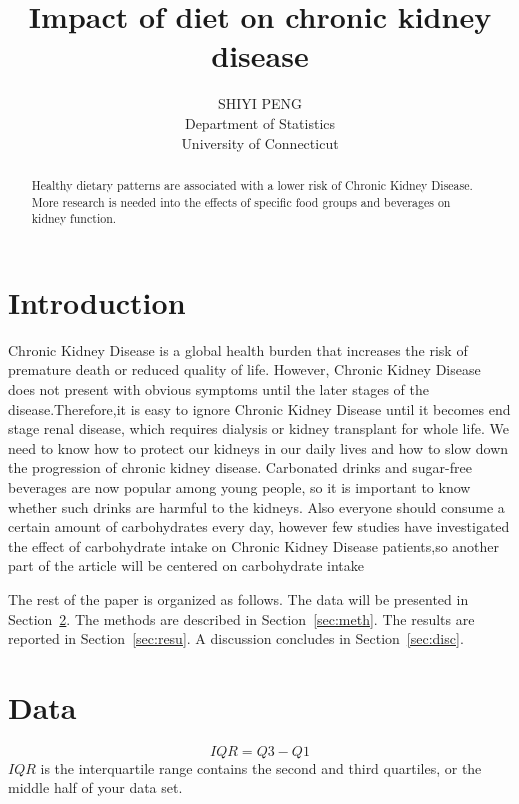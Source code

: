 \documentclass[12pt]{article}
\title{Impact of diet on chronic kidney disease}
\author{SHIYI PENG\\
  Department of Statistics\\
  University of Connecticut
}
\begin{document}
\maketitle

\begin{abstract}

Healthy dietary patterns are associated with a lower risk of Chronic Kidney Disease. More research is needed into the effects of specific food groups and beverages on kidney function\cite{van2020diet}.

\end{abstract}


\section{Introduction}
\label{sec:intro}

Chronic Kidney Disease is a global health burden that increases the risk of premature death or reduced quality of life. However, Chronic Kidney Disease does not present with obvious symptoms until the later stages of the disease.Therefore,it is easy to ignore Chronic Kidney Disease until it becomes end stage renal disease, which requires dialysis or kidney transplant for whole life. We need to know how to protect our kidneys in our daily lives and how to slow down the progression of chronic kidney disease. Carbonated drinks and sugar-free beverages are now popular among young people, so it is important to know whether such drinks are harmful to the kidneys. Also everyone should consume a certain amount of carbohydrates every day, however few studies have investigated the effect of carbohydrate intake on Chronic Kidney Disease patients,so another part of the article will be centered on carbohydrate intake\cite{hill2016global}

The rest of the paper is organized as follows.
The data will be presented in Section~\ref{sec:data}.
The methods are described in Section~\ref{sec:meth}.
The results are reported in Section~\ref{sec:resu}.
A discussion concludes in Section~\ref{sec:disc}.


\section{Data}
\label{sec:data}
\begin{equation}
  IQR=Q3-Q1
\end{equation}
$IQR$ is the interquartile range contains the second and third quartiles, or the middle half of your data set. 
\end{document}
